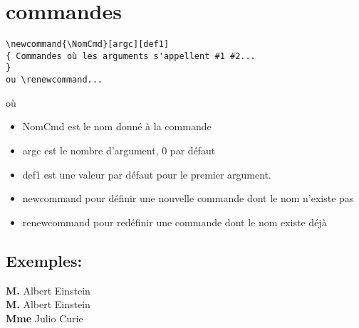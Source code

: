 % 
% 
% 
\section{commandes}

\begin{verbatim}
\newcommand{\NomCmd}[argc][def1]
{ Commandes où les arguments s'appellent #1 #2...
}
ou \renewcommand...
\end{verbatim}
où
\begin{itemize}
\item NomCmd est le nom donné à la commande 
\item argc est le nombre d'argument, 0 par défaut
\item def1 est une valeur par défaut pour le premier argument.
\item newcommand pour définir une nouvelle commande dont le nom n'existe pas 
\item renewcommand pour redéfinir une commande dont le nom existe déjà 
\end{itemize}

\subsection{Exemples:}

\newcommand{\EtatCivil}[3]{\textbf{#1} #2 #3}
\EtatCivil{M.}{Albert}{Einstein}\\
\renewcommand{\EtatCivil}[3][M.]{\textbf{#1} #2 #3}
\EtatCivil{Albert}{Einstein}\\
\EtatCivil[Mme]{Julio}{Curie}\\

